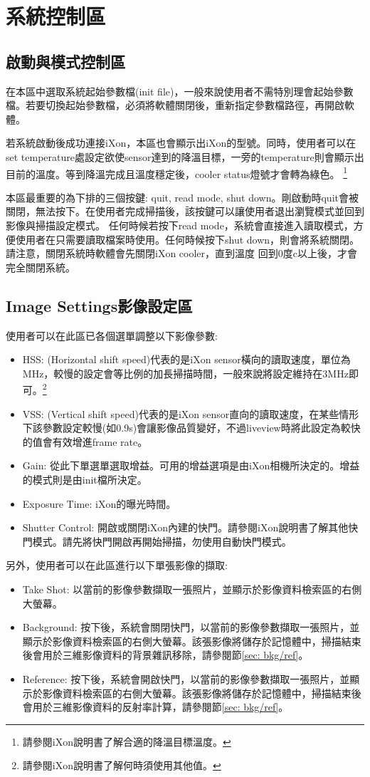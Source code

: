 \documentclass[12pt]{article}
\begin{document}
    \section{系統控制區}
    \subsection{啟動與模式控制區}
    在本區中選取系統起始參數檔(init file)，一般來說使用者不需特別理會起始參數檔。若要切換起始參數檔，必須將軟體關閉後，重新指定參數檔路徑，再開啟軟體。

    若系統啟動後成功連接iXon，本區也會顯示出iXon的型號。同時，使用者可以在set temperature處設定欲使sensor達到的降溫目標，一旁的temperature則會顯示出目前的溫度。等到降溫完成且溫度穩定後，cooler status燈號才會轉為綠色。
    \footnote{請參閱iXon說明書了解合適的降溫目標溫度。}

    本區最重要的為下排的三個按鍵: quit, read mode, shut down。剛啟動時quit會被關閉，無法按下。在使用者完成掃描後，該按鍵可以讓使用者退出瀏覽模式並回到影像與掃描設定模式。
    任何時候若按下read mode，系統會直接進入讀取模式，方便使用者在只需要讀取檔案時使用。任何時候按下shut down，則會將系統關閉。請注意，關閉系統時軟體會先關閉iXon cooler，直到溫度
    回到0度c以上後，才會完全關閉系統。
    \subsection{Image Settings影像設定區}
    使用者可以在此區已各個選單調整以下影像參數:
    \begin{itemize}
        \item HSS: (Horizontal shift speed)代表的是iXon sensor橫向的讀取速度，單位為MHz，較慢的設定會等比例的加長掃描時間，一般來說將設定維持在3MHz即可。\footnote{請參閱iXon說明書了解何時須使用其他值。}
        \item VSS: (Vertical shift speed)代表的是iXon sensor直向的讀取速度，在某些情形下該參數設定較慢(如0.9s)會讓影像品質變好，不過liveview時將此設定為較快的值會有效增進frame rate。
        \item Gain: 從此下單選單選取增益。可用的增益選項是由iXon相機所決定的。增益的模式則是由init檔所決定。
        \item Exposure Time: iXon的曝光時間。
        \item Shutter Control: 開啟或關閉iXon內建的快門。請參閱iXon說明書了解其他快門模式。請先將快門開啟再開始掃描，勿使用自動快門模式。
    \end{itemize}
    另外，使用者可以在此區進行以下單張影像的擷取:
    \begin{itemize}
        \item Take Shot: 以當前的影像參數擷取一張照片，並顯示於影像資料檢索區的右側大螢幕。
        \item Background: 按下後，系統會關閉快門，以當前的影像參數擷取一張照片，並顯示於影像資料檢索區的右側大螢幕。該張影像將儲存於記憶體中，掃描結束後會用於三維影像資料的背景雜訊移除，請參閱節\ref{sec: bkg/ref}。
        \item Reference: 按下後，系統會開啟快門，以當前的影像參數擷取一張照片，並顯示於影像資料檢索區的右側大螢幕。該張影像將儲存於記憶體中，掃描結束後會用於三維影像資料的反射率計算，請參閱節\ref{sec: bkg/ref}。
    \end{itemize}
\end{document}
